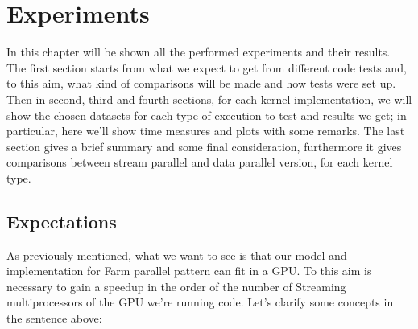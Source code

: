 \chapter{Experiments}
\label{chap:experim}
In this chapter will be shown all the performed experiments and their results. The first section starts from what we expect to get from different code tests and, to this aim, what kind of comparisons will be made and how tests were set up.\\
Then in second, third and fourth sections, for each kernel implementation, we will show the chosen datasets for each type of execution to test and results we get; in particular, here we'll show time measures and plots with some remarks.
The last section gives a brief summary and some final consideration, furthermore it gives comparisons between stream parallel and data parallel version, for each kernel type.

\section{Expectations}
As previously mentioned, what we want to see is that our model and implementation for Farm parallel pattern can fit in a GPU.
To this aim is necessary to gain a speedup in the order of the number of Streaming multiprocessors of the GPU we're running code.
Let's clarify some concepts in the sentence above:

